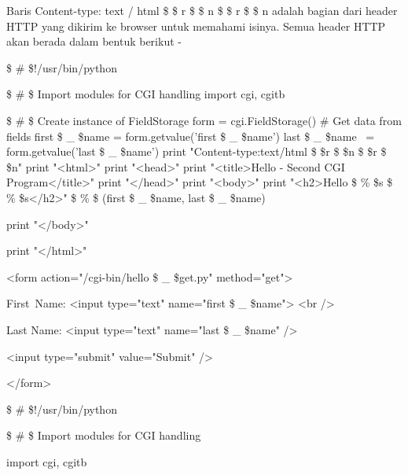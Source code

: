 \begin{12pt}
\begin{12pt}
\vspace{12pt}
\noindent 
Baris Content-type: text / html  \$  \setminus  \$ r  \$  \setminus  \$ n  \$  \setminus  \$ r  \$  \setminus  \$ n adalah bagian dari header HTTP yang dikirim ke browser untuk memahami isinya. Semua header HTTP akan berada dalam bentuk berikut - \par
\noindent 
 \$  \#  \$!/usr/bin/python \par
\vspace{12pt}
\noindent 
 \$  \#  \$ Import modules for CGI handling  
\noindent 
import cgi, cgitb  \par
\vspace{12pt}
\noindent 
 \$  \#  \$ Create instance of FieldStorage 
\noindent 
form = cgi.FieldStorage()  
\vspace{12pt}
\noindent 
   \#   Get data from fields 
\noindent 
first \$  \_  \$name = form.getvalue('first \$  \_  \$name') 
\noindent 
last \$  \_  \$name~ = form.getvalue('last \$  \_  \$name') 
\vspace{12pt}
\noindent 
print "Content-type:text/html \$  \setminus  \$r \$  \setminus  \$n \$  \setminus  \$r \$  \setminus  \$n" 
\noindent 
print "<html>" 
\noindent 
print "<head>" 
\noindent 
print "<title>Hello - Second CGI Program</title>" 
\noindent 
print "</head>" 
\noindent 
print "<body>" 
\noindent 
print "<h2>Hello  \$  \%  \$s  \$  \%  \$s</h2>"  \$  \%  \$ (first \$  \_  \$name, last \$  \_  \$name) \par
\noindent 
print "</body>" \par
\noindent 
print "</html>" \par
\vspace{12pt}
\noindent 
<form action="/cgi-bin/hello \$  \_  \$get.py" method="get"> \par
\noindent 
First~Name: <input type="text" name="first \$  \_  \$name">  <br /> \par
\vspace{12pt}
\noindent 
Last Name: <input type="text" name="last \$  \_  \$name" /> \par
\noindent 
<input type="submit" value="Submit" /> \par
\noindent 
</form> \par
\vspace{12pt}
\noindent 
 \$  \#  \$!/usr/bin/python \par
\vspace{12pt}
\noindent 
 \$  \#  \$ Import modules for CGI handling  \par
\noindent 
import cgi, cgitb  \par

\end{12pt}
\end{12pt}
